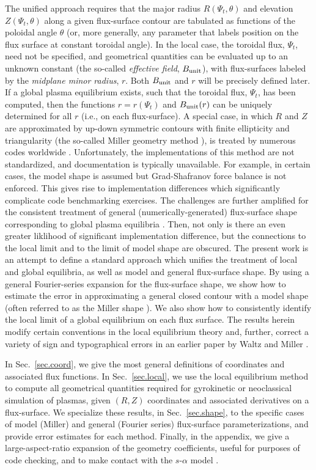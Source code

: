 The unified approach requires that the major radius $R(\Psi_t,\theta)$ 
and elevation $Z(\Psi_t,\theta)$ along a given flux-surface 
contour are tabulated as functions of the poloidal angle $\theta$ 
(or, more generally, any parameter that labels position on the 
flux surface at constant toroidal angle).   In the local case, 
the toroidal flux, $\Psi_t$, need not be specified, and geometrical 
quantities can be evaluated up to an unknown constant (the 
so-called {\it effective field}, $B_{\rm unit}$), with flux-surfaces labeled 
by the {\it midplane minor radius}, $r$.  Both $B_{\rm unit}$ and $r$ will 
be precisely defined later.   If a global plasma equilibrium exists, 
such that the toroidal flux, $\Psi_t$, has been computed, then 
the functions $r = r(\Psi_t)$ and $B_{\rm unit}(r)$ can be uniquely 
determined for all $r$ (i.e., on each flux-surface).  
A special case, in which $R$ and $Z$ are approximated by up-down 
symmetric contours with finite ellipticity and triangularity (the 
so-called Miller geometry method \cite{miller:1998}), is treated 
by numerous codes worldwide \cite{dorland:2000,candy:2003,chen:2003}.
Unfortunately, the implementations of this method are not 
standardized, and documentation is typically unavailable.  
For example, in certain cases, the model shape is assumed but
Grad-Shafranov force balance is not enforced.  This gives rise
to implementation differences which significantly complicate 
code benchmarking exercises.  The challenges are further amplified 
for the consistent treatment of general (numerically-generated) 
flux-surface shape corresponding to global plasma equilibria 
\cite{xanthopoulos:2008}.  Then, not only is there an even 
greater liklihood of significant implementation difference, 
but the connections to the local limit and to the limit of 
model shape are obscured. The present work is an attempt to 
define a standard approach which unifies the treatment of 
local and global equilibria, as well as model and general
flux-surface shape.  By using a general Fourier-series 
expansion for the flux-surface shape, we show how to 
estimate the error in approximating a general closed 
contour with a model shape (often referred to as the Miller 
shape \cite{miller:1998,waltz:1999}).  We also show how to
consistently identify the local limit of a global 
equilibrium on each flux surface.  The results herein 
modify certain conventions in the local equilibrium theory 
and, further, correct a variety of sign and typographical 
errors in an earlier paper by Waltz and Miller \cite{waltz:1999}.

In Sec.~\ref{sec.coord}, we give the most general definitions
of coordinates and associated flux functions.  In Sec.~\ref{sec.local},
we use the local equilibrium method to compute all geometrical 
quantities required for gyrokinetic or neoclassical simulation 
of plasmas, given $(R,Z)$ coordinates and associated derivatives 
on a flux-surface.  We specialize these results, in 
Sec.~\ref{sec.shape}, to the specific cases of model 
(Miller) and general (Fourier series) flux-surface 
parameterizations, and provide error estimates for 
each method.  Finally, in the appendix, we give a 
large-aspect-ratio expansion of the geometry coefficients,
useful for purposes of code checking, and to make 
contact with the $s$-$\alpha$ model \cite{connor:1978}.

